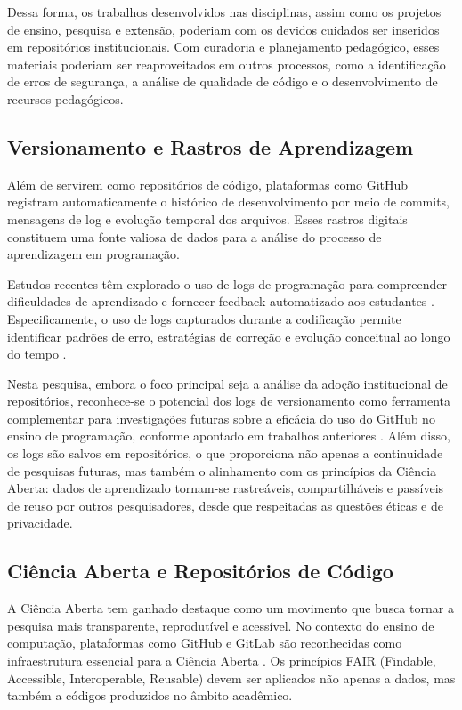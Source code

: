 \documentclass[english, spanish, brazilian]{RBIEarticle}
\begin{document}
	Dessa forma, os trabalhos desenvolvidos nas disciplinas, assim como os projetos de ensino, pesquisa e extensão, poderiam com os devidos cuidados ser inseridos em repositórios institucionais. Com curadoria e planejamento pedagógico, esses materiais poderiam ser reaproveitados em outros processos, como a identificação de erros de segurança, a análise de qualidade de código e o desenvolvimento de recursos pedagógicos.
	
	\subsection{Versionamento e Rastros de Aprendizagem}
	
	Além de servirem como repositórios de código, plataformas como GitHub registram automaticamente o histórico de desenvolvimento por meio de commits, mensagens de log e evolução temporal dos arquivos. Esses rastros digitais constituem uma fonte valiosa de dados para a análise do processo de aprendizagem em programação.
	
	Estudos recentes têm explorado o uso de logs de programação para compreender dificuldades de aprendizado e fornecer feedback automatizado aos estudantes \cite{qian2017, nascimento2026logs}. Especificamente, o uso de logs capturados durante a codificação permite identificar padrões de erro, estratégias de correção e evolução conceitual ao longo do tempo \cite{nascimento2026logs}.
	
	Nesta pesquisa, embora o foco principal seja a análise da adoção institucional de repositórios, reconhece-se o potencial dos logs de versionamento como ferramenta complementar para investigações futuras sobre a eficácia do uso do GitHub no ensino de programação, conforme apontado em trabalhos anteriores \cite{nascimento2026logs}. Além disso, os logs são salvos em repositórios, o que proporciona não apenas a continuidade de pesquisas futuras, mas também o alinhamento com os princípios da Ciência Aberta: dados de aprendizado tornam-se rastreáveis, compartilháveis e passíveis de reuso por outros pesquisadores, desde que respeitadas as questões éticas e de privacidade.
	
	\subsection{Ciência Aberta e Repositórios de Código}
	
	A Ciência Aberta tem ganhado destaque como um movimento que busca tornar a pesquisa mais transparente, reprodutível e acessível. No contexto do ensino de computação, plataformas como GitHub e GitLab são reconhecidas como infraestrutura essencial para a Ciência Aberta \cite{momcheva2025}. Os princípios FAIR (Findable, Accessible, Interoperable, Reusable) devem ser aplicados não apenas a dados, mas também a códigos produzidos no âmbito acadêmico.
	
\end{document}
